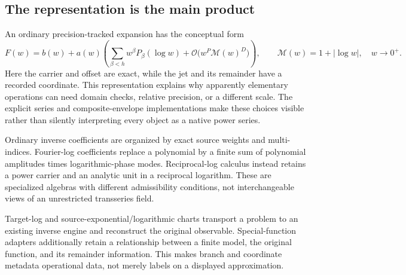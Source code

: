 \documentclass[11pt,a4paper]{article}
\newcommand{\OO}{\mathcal O}
\newcommand{\M}{\mathcal M}
\begin{document}
\subsection{The representation is the main product}
An ordinary precision-tracked expansion has the conceptual form
\begin{equation}
 F(w)=b(w)+a(w)\left(\sum_{\beta<h}w^\beta P_\beta(\log w)
              +\OO\bigl(w^P\M(w)^D\bigr)\right),\qquad
 \M(w)=1+|\log w|,\quad w\to0^+.
 \label{eq:representation}
\end{equation}
Here the carrier and offset are exact, while the jet and its remainder have a recorded coordinate. This representation explains why apparently elementary operations can need domain checks, relative precision, or a different scale. The explicit series and composite-envelope implementations make these choices visible rather than silently interpreting every object as a native power series.\cite{operations,envelope}

Ordinary inverse coefficients are organized by exact source weights and multi-indices. Fourier-log coefficients replace a polynomial by a finite sum of polynomial amplitudes times logarithmic-phase modes. Reciprocal-log calculus instead retains a power carrier and an analytic unit in a reciprocal logarithm. These are specialized algebras with different admissibility conditions, not interchangeable views of an unrestricted transseries field.\cite{main,fourier,reciprocal}

Target-log and source-exponential/logarithmic charts transport a problem to an existing inverse engine and reconstruct the original observable. Special-function adapters additionally retain a relationship between a finite model, the original function, and its remainder information. This makes branch and coordinate metadata operational data, not merely labels on a displayed approximation.\cite{coordinate,sourcecoords,special}
\end{document}
